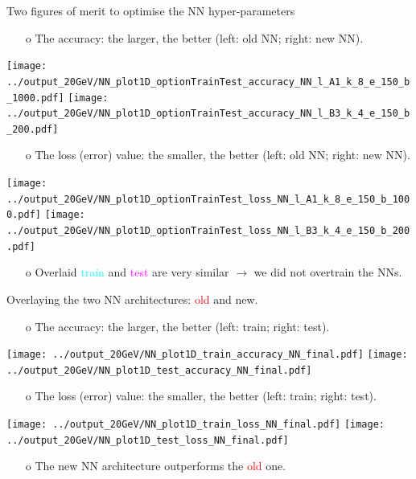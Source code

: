 \begin{frame}{Two figures of merit to optimise the NN hyper-parameters}
\begin{enumerate}
\item[o] The accuracy: the larger, the better (left: old NN; right: new NN).
\end{enumerate}
\centering
\texttt{[image: ../output\_20GeV/NN\_plot1D\_optionTrainTest\_accuracy\_NN\_l\_A1\_k\_8\_e\_150\_b\_1000.pdf]}
\texttt{[image: ../output\_20GeV/NN\_plot1D\_optionTrainTest\_accuracy\_NN\_l\_B3\_k\_4\_e\_150\_b\_200.pdf]}\\
\begin{enumerate}
\item[o] The loss (error) value: the smaller, the better (left: old NN; right: new NN).
\end{enumerate}
\centering
\texttt{[image: ../output\_20GeV/NN\_plot1D\_optionTrainTest\_loss\_NN\_l\_A1\_k\_8\_e\_150\_b\_1000.pdf]}
\texttt{[image: ../output\_20GeV/NN\_plot1D\_optionTrainTest\_loss\_NN\_l\_B3\_k\_4\_e\_150\_b\_200.pdf]}\\
\begin{enumerate}
\item[o] Overlaid \textcolor{cyan}{train} and \textcolor{magenta}{test} are very similar $\rightarrow$ we did not overtrain the NNs. 
\end{enumerate}
\end{frame}
\clearpage

\begin{frame}{Overlaying the two NN architectures: \textcolor{red}{old} and \textcolor{OliveGreen}{new}. }
\begin{enumerate}
\item[o] The accuracy: the larger, the better (left: train; right: test).
\end{enumerate}
\centering
\texttt{[image: ../output\_20GeV/NN\_plot1D\_train\_accuracy\_NN\_final.pdf]}
\texttt{[image: ../output\_20GeV/NN\_plot1D\_test\_accuracy\_NN\_final.pdf]}\\
\begin{enumerate}
\item[o] The loss (error) value: the smaller, the better (left: train; right: test).
\end{enumerate}
\centering
\texttt{[image: ../output\_20GeV/NN\_plot1D\_train\_loss\_NN\_final.pdf]}
\texttt{[image: ../output\_20GeV/NN\_plot1D\_test\_loss\_NN\_final.pdf]}\\
\begin{enumerate}
\item[o] The \textcolor{OliveGreen}{new} NN architecture outperforms the \textcolor{red}{old} one.
\end{enumerate}
\end{frame}
\clearpage

